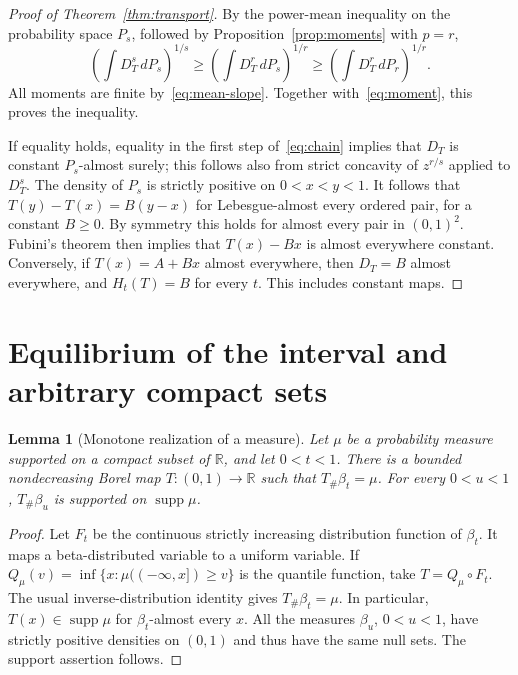 \documentclass[11pt]{article}
\newtheorem{lemma}[theorem]{Lemma}
\theoremstyle{remark}
\newcommand{\R}{\mathbb R}
\newcommand{\dd}{\,d}
\newcommand{\push}{_{\#}}
\DeclareMathOperator{\supp}{supp}
\begin{document}
\begin{proof}[Proof of Theorem~\ref{thm:transport}]
By the power-mean inequality on the probability space $P_s$, followed
by Proposition~\ref{prop:moments} with $p=r$,
\begin{equation}\label{eq:chain}
 \left(\int D_T^s\dd P_s\right)^{1/s}
 \geq\left(\int D_T^r\dd P_s\right)^{1/r}
 \geq\left(\int D_T^r\dd P_r\right)^{1/r}.
\end{equation}
All moments are finite by~\eqref{eq:mean-slope}.
Together with~\eqref{eq:moment}, this proves the inequality.

If equality holds, equality in the first step of~\eqref{eq:chain}
implies that $D_T$ is constant $P_s$-almost surely; this follows also
from strict concavity of $z^{r/s}$ applied to $D_T^s$.
The density of $P_s$ is strictly positive on $0<x<y<1$.
It follows that $T(y)-T(x)=B(y-x)$ for Lebesgue-almost every ordered
pair, for a constant $B\geq0$. By symmetry this holds for almost every
pair in $(0,1)^2$. Fubini's theorem then implies that $T(x)-Bx$ is
almost everywhere constant. Conversely, if $T(x)=A+Bx$ almost
everywhere, then $D_T=B$ almost everywhere, and $H_t(T)=B$ for every
$t$. This includes constant maps.
\end{proof}

\section{Equilibrium of the interval and arbitrary compact sets}

\begin{lemma}[Monotone realization of a measure]\label{lem:quantile}
Let $\mu$ be a probability measure supported on a compact subset of
$\R$, and let $0<t<1$. There is a bounded nondecreasing Borel map
$T:(0,1)\to\R$ such that $T\push\beta_t=\mu$.
For every $0<u<1$, $T\push\beta_u$ is supported on $\supp\mu$.
\end{lemma}

\begin{proof}
Let $F_t$ be the continuous strictly increasing distribution function
of $\beta_t$. It maps a beta-distributed variable to a uniform variable.
If $Q_\mu(v)=\inf\{x:\mu(( -\infty,x])\geq v\}$ is the quantile
function, take $T=Q_\mu\circ F_t$. The usual inverse-distribution
identity gives $T\push\beta_t=\mu$. In particular,
$T(x)\in\supp\mu$ for $\beta_t$-almost every $x$.
All the measures $\beta_u$, $0<u<1$, have strictly positive densities
on $(0,1)$ and thus have the same null sets. The support assertion follows.
\end{proof}
\end{document}
